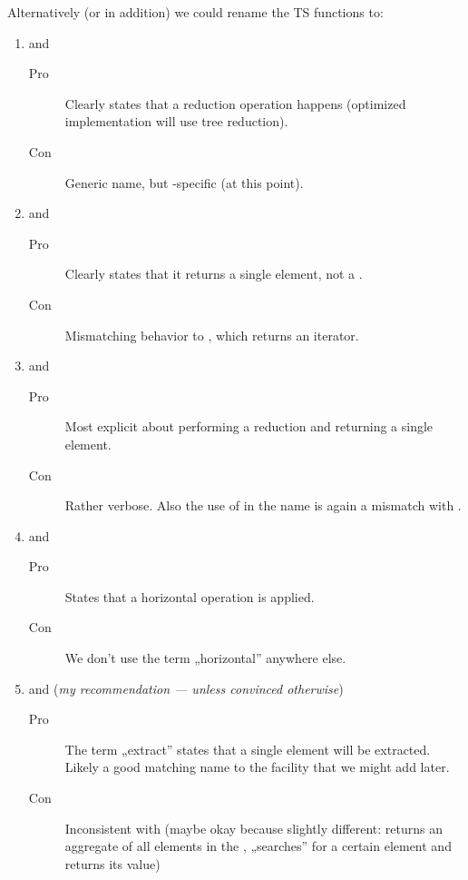 Alternatively (or in addition) we could rename the TS functions to:
\begin{enumerate}
  \item\label{enum:reduce_min}  and
    \begin{description}
      \item[Pro] Clearly states that a reduction operation happens (optimized
        implementation will use tree reduction).
      \item[Con] Generic name, but \simd-specific (at this point).
    \end{description}

  \item\label{enum:min_element}  and
    \begin{description}
      \item[Pro] Clearly states that it returns a single element, not a \simd.
      \item[Con] Mismatching behavior to \stdranges{}, which
        returns an iterator.
    \end{description}

  \item\label{enum:reduce_min_element}  and
    \begin{description}
      \item[Pro] Most explicit about performing a reduction and returning a
        single element.
      \item[Con] Rather verbose. Also the use of  in the name
        is again a mismatch with \stdranges{}.
    \end{description}

  \item\label{enum:horizontal_min}  and
    \begin{description}
      \item[Pro] States that a horizontal operation is applied.
      \item[Con] We don't use the term „horizontal'' anywhere else.
    \end{description}

  \item\label{enum:extract_min}  and
     (\emph{my recommendation --- unless convinced
    otherwise})
    \begin{description}
      \item[Pro] The term „extract'' states that a single element will be
        extracted. Likely a good matching name to the  facility
        that we might add later.
      \item[Con] Inconsistent with \std{} (maybe okay because
        slightly different:  returns an aggregate of all
        elements in the \simd,  „searches'' for a certain
        element and returns its value)
    \end{description}


\end{enumerate}
